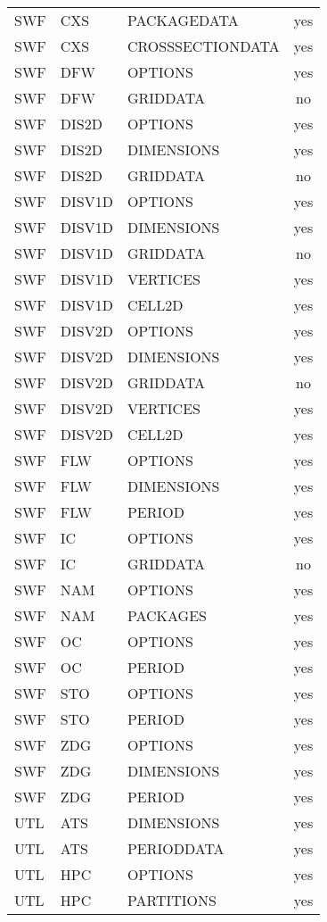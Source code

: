 \begin{longtable}{p{1.5cm} p{1.5cm} p{3cm} c}
SWF & CXS & PACKAGEDATA & yes \\ 
SWF & CXS & CROSSSECTIONDATA & yes \\ 
\hline
SWF & DFW & OPTIONS & yes \\ 
SWF & DFW & GRIDDATA & no \\ 
\hline
SWF & DIS2D & OPTIONS & yes \\ 
SWF & DIS2D & DIMENSIONS & yes \\ 
SWF & DIS2D & GRIDDATA & no \\ 
\hline
SWF & DISV1D & OPTIONS & yes \\ 
SWF & DISV1D & DIMENSIONS & yes \\ 
SWF & DISV1D & GRIDDATA & no \\ 
SWF & DISV1D & VERTICES & yes \\ 
SWF & DISV1D & CELL2D & yes \\ 
\hline
SWF & DISV2D & OPTIONS & yes \\ 
SWF & DISV2D & DIMENSIONS & yes \\ 
SWF & DISV2D & GRIDDATA & no \\ 
SWF & DISV2D & VERTICES & yes \\ 
SWF & DISV2D & CELL2D & yes \\ 
\hline
SWF & FLW & OPTIONS & yes \\ 
SWF & FLW & DIMENSIONS & yes \\ 
SWF & FLW & PERIOD & yes \\ 
\hline
SWF & IC & OPTIONS & yes \\ 
SWF & IC & GRIDDATA & no \\ 
\hline
SWF & NAM & OPTIONS & yes \\ 
SWF & NAM & PACKAGES & yes \\ 
\hline
SWF & OC & OPTIONS & yes \\ 
SWF & OC & PERIOD & yes \\ 
\hline
SWF & STO & OPTIONS & yes \\ 
SWF & STO & PERIOD & yes \\ 
\hline
SWF & ZDG & OPTIONS & yes \\ 
SWF & ZDG & DIMENSIONS & yes \\ 
SWF & ZDG & PERIOD & yes \\ 
\hline
UTL & ATS & DIMENSIONS & yes \\ 
UTL & ATS & PERIODDATA & yes \\ 
\hline
UTL & HPC & OPTIONS & yes \\ 
UTL & HPC & PARTITIONS & yes \\ 

\end{longtable}
